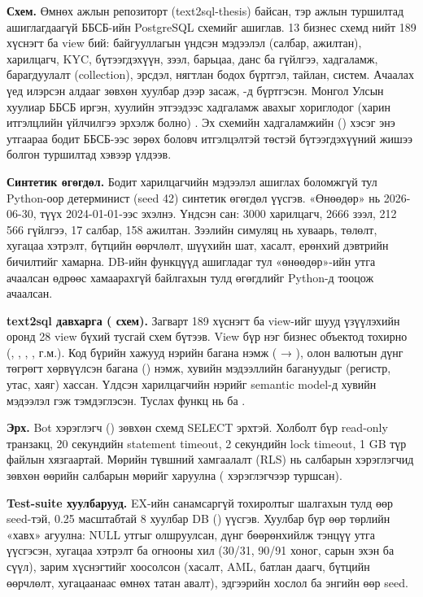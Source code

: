 \textbf{Схем.} Өмнөх ажлын репозиторт (text2sql-thesis) байсан, тэр ажлын туршилтад ашиглагдаагүй ББСБ-ийн PostgreSQL
схемийг ашиглав. 13 бизнес схемд нийт 189 хүснэгт ба view бий: байгууллагын үндсэн мэдээлэл (салбар, ажилтан),
харилцагч, KYC, бүтээгдэхүүн, зээл, барьцаа, данс ба гүйлгээ, хадгаламж, барагдуулалт (collection), эрсдэл, нягтлан
бодох бүртгэл, тайлан, систем. Ачаалах үед илэрсэн алдааг зөвхөн хуулбар дээр засаж, -д бүртгэсэн.
Монгол Улсын хуулиар ББСБ иргэн, хуулийн этгээдээс хадгаламж авахыг хориглодог (харин итгэлцлийн үйлчилгээ эрхэлж
болно) \cite{mn_2002_nbfi_law}. Эх схемийн хадгаламжийн () хэсэг энэ утгаараа бодит ББСБ-ээс зөрөх
боловч итгэлцэлтэй төстэй бүтээгдэхүүний жишээ болгон туршилтад хэвээр үлдээв.

\textbf{Синтетик өгөгдөл.} Бодит харилцагчийн мэдээлэл ашиглах боломжгүй тул Python-оор детерминист (seed 42)
синтетик өгөгдөл үүсгэв. «Өнөөдөр» нь 2026-06-30, түүх 2024-01-01-ээс эхэлнэ. Үндсэн сан: 3000 харилцагч, 2666 зээл,
212 566 гүйлгээ, 17 салбар, 158 ажилтан. Зээлийн симуляц нь хуваарь, төлөлт, хугацаа хэтрэлт, бүтцийн өөрчлөлт,
шүүхийн шат, хасалт, ерөнхий дэвтрийн бичилтийг хамарна. DB-ийн функцүүд  ашигладаг тул «өнөөдөр»-ийн
утга ачаалсан өдрөөс хамаарахгүй байлгахын тулд өгөгдлийг Python-д тооцож ачаалсан.

\textbf{text2sql давхарга ( схем).} Загварт 189 хүснэгт ба view-ийг шууд үзүүлэхийн оронд 28 view бүхий
тусгай схем бүтээв. View бүр нэг бизнес объектод тохирно (, , ,
,  г.м.). Код бүрийн хажууд нэрийн багана нэмж ( → ),
олон валютын дүнг төгрөгт хөрвүүлсэн багана () нэмж, хувийн мэдээллийн багануудыг (регистр, утас,
хаяг) хассан. Үлдсэн харилцагчийн нэрийг semantic model-д хувийн мэдээлэл гэж тэмдэглэсэн. Туслах функц нь
 ба .

\textbf{Эрх.} Bot хэрэглэгч () зөвхөн  схемд SELECT эрхтэй. Холболт бүр read-only
транзакц, 20 секундийн statement timeout, 2 секундийн lock timeout, 1 GB түр файлын хязгаартай. Мөрийн түвшний
хамгаалалт (RLS) нь салбарын хэрэглэгчид зөвхөн өөрийн салбарын мөрийг харуулна
( хэрэглэгчээр туршсан).

\textbf{Test-suite хуулбарууд.} EX-ийн санамсаргүй тохиролтыг шалгахын тулд өөр seed-тэй, 0.25 масштабтай 8 хуулбар
DB () үүсгэв. Хуулбар бүр өөр төрлийн «хавх» агуулна: NULL утгыг олшруулсан, дүнг бөөрөнхийлж тэнцүү
утга үүсгэсэн, хугацаа хэтрэлт ба огнооны хил (30/31, 90/91 хоног, сарын эхэн ба сүүл), зарим хүснэгтийг хоосолсон
(хасалт, AML, батлан даагч, бүтцийн өөрчлөлт, хугацаанаас өмнөх татан авалт), эдгээрийн хослол ба энгийн өөр seed.

